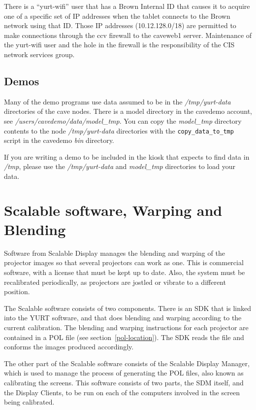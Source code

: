 \documentclass[11pt]{article}
\newcommand{\yurt}{YURT\xspace}
\newcommand{\cmd}[1]{\texttt{#1}\xspace}
\newcommand{\dir}[1]{\textit{#1}\xspace}
\begin{document}
There is a ``yurt-wifi'' user that has a Brown Internal ID that causes
it to acquire one of a specific set of IP addresses when the tablet
connects to the Brown network using that ID. Those IP addresses
(10.12.128.0/18) are permitted to make connections through the ccv
firewall to the caveweb1 server.  Maintenance of the yurt-wifi user
and the hole in the firewall is the responsibility of the CIS network
services group.


\subsection{Demos}
\label{Demos}

Many of the demo programs use data assumed to be in the
\dir{/tmp/yurt-data} directories of the cave nodes.  There is a model
directory in the cavedemo account, see
\dir{/users/cavedemo/data/model\_tmp}.  You can copy the
\dir{model\_tmp} directory contents to the node \dir{/tmp/yurt-data}
directories with the \cmd{copy\_data\_to\_tmp} script in the cavedemo
\dir{bin} directory.

If you are writing a demo to be included in the kiosk that expects to
find data in \dir{/tmp}, please use the  \dir{/tmp/yurt-data} and
\dir{model\_tmp} directories to load your data.


\section{Scalable software, Warping and Blending}

Software from Scalable Display manages the blending and warping of the
projector images so that several projectors can work as one.  This is
commercial software, with a license that must be kept up to date.
Also, the system must be recalibrated periodically, as projectors are
jostled or vibrate to a different position.

The Scalable software consists of two components.  There is an SDK
that is linked into the \yurt software, and that does blending and
warping according to the current calibration.  The blending and
warping instructions for each projector are contained in a POL file
(see section~\ref{pol-location}).  The SDK reads the file and conforms
the images produced accordingly.

The other part of the Scalable software consists of the Scalable
Display Manager, which is used to manage the process of generating the
POL files, also known as calibrating the screens.  This software
consists of two parts, the SDM itself, and the Display Clients,
to be run on each of the computers involved in the screen being
calibrated.
\end{document}
